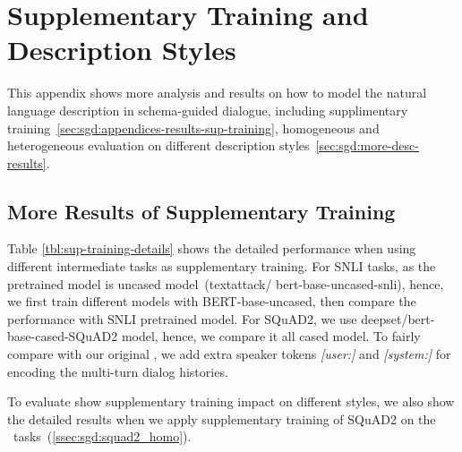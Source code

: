 \chapter{Supplementary Training and Description Styles}
\label{chap:appendix:schema-analysis}
This appendix shows more analysis and results on how to model the
natural language description in schema-guided dialogue, including
supplimentary
training~\autoref{sec:sgd:appendices-results-sup-training},
homogeneous and heterogeneous evaluation on different description
styles~\autoref{sec:sgd:more-desc-results}.

\section{More Results of Supplementary Training}
\label{sec:sgd:appendices-results-sup-training}
Table \ref{tbl:sup-training-details} shows the detailed performance
when using different intermediate tasks as supplementary training.  For
SNLI tasks, as the pretrained model is uncased model~(textattack/
bert-base-uncased-snli), hence, we first train different models with
BERT-base-uncased, then compare the performance with SNLI pretrained
model. For SQuAD2, we use deepset/bert-base-cased-SQuAD2 model, hence,
we compare it all cased model. To fairly compare with our original
\CE, we add extra speaker tokens \emph{[user:]} and \emph{[system:]} for encoding
the multi-turn dialog histories.

To evaluate show supplementary training impact on different styles, we
also show the detailed results when we apply supplementary training of
SQuAD2 on the \NSL~tasks~(\autoref{ssec:sgd:squad2_homo}).

